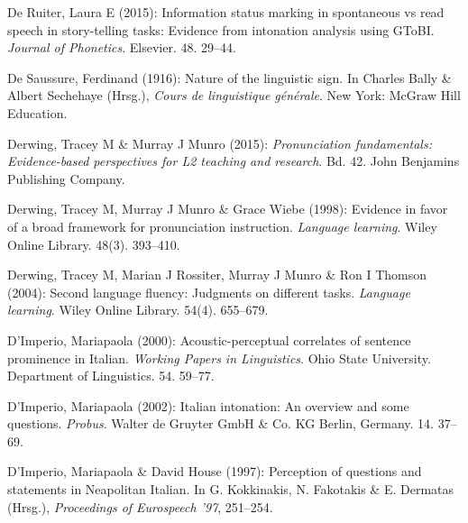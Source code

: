 \begin{styleBibliography}
De Ruiter, Laura E (2015): Information status marking in spontaneous vs read speech in story-telling tasks: Evidence from intonation analysis using GToBI. \textit{Journal of Phonetics}. Elsevier. 48. 29–44.
\end{styleBibliography}

\begin{styleBibliography}
De Saussure, Ferdinand (1916): Nature of the linguistic sign. In Charles Bally \& Albert Sechehaye (Hrsg.), \textit{Cours de linguistique générale}. New York: McGraw Hill Education.
\end{styleBibliography}

\begin{styleBibliography}
Derwing, Tracey M \& Murray J Munro (2015): \textit{Pronunciation fundamentals: Evidence-based perspectives for L2 teaching and research}. Bd. 42. John Benjamins Publishing Company.
\end{styleBibliography}

\begin{styleBibliography}
Derwing, Tracey M, Murray J Munro \& Grace Wiebe (1998): Evidence in favor of a broad framework for pronunciation instruction. \textit{Language learning}. Wiley Online Library. 48(3). 393–410.
\end{styleBibliography}

\begin{styleBibliography}
Derwing, Tracey M, Marian J Rossiter, Murray J Munro \& Ron I Thomson (2004): Second language fluency: Judgments on different tasks. \textit{Language learning}. Wiley Online Library. 54(4). 655–679.
\end{styleBibliography}

\begin{styleBibliography}
D’Imperio, Mariapaola (2000): Acoustic-perceptual correlates of sentence prominence in Italian. \textit{Working Papers in Linguistics}. Ohio State University. Department of Linguistics. 54. 59–77.
\end{styleBibliography}

\begin{styleBibliography}
D’Imperio, Mariapaola (2002): Italian intonation: An overview and some questions. \textit{Probus}. Walter de Gruyter GmbH \& Co. KG Berlin, Germany. 14. 37–69.
\end{styleBibliography}

\begin{styleBibliography}
D’Imperio, Mariapaola \& David House (1997): Perception of questions and statements in Neapolitan Italian. In G. Kokkinakis, N. Fakotakis \& E. Dermatas (Hrsg.), \textit{Proceedings of Eurospeech ’97}, 251–254.
\end{styleBibliography}

